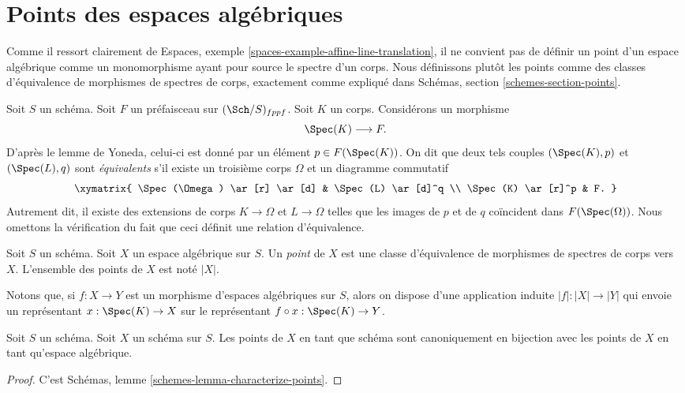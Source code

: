 \section{Points des espaces algébriques}
\label{section-points}

\noindent
Comme il ressort clairement de
Espaces, exemple \ref{spaces-example-affine-line-translation},
il ne convient pas de définir un point d'un espace algébrique comme un monomorphisme
ayant pour source le spectre d'un corps.
Nous définissons plutôt les points comme des classes d'équivalence de morphismes de spectres
de corps, exactement comme expliqué dans
Schémas, section \ref{schemes-section-points}.

\medskip\noindent
Soit $S$ un schéma.
Soit $F$ un préfaisceau sur $(\Sch/S)_{fppf}$.
Soit $K$ un corps. Considérons un morphisme
$$
\Spec(K) \longrightarrow F.
$$
D'après le lemme de Yoneda, celui-ci est donné par un
élément $p \in F(\Spec(K))$. On dit que deux tels
couples $(\Spec(K), p)$ et $(\Spec(L), q)$
sont {\it équivalents} s'il existe
un troisième corps $\Omega$ et un diagramme commutatif
$$
\xymatrix{
\Spec(\Omega) \ar[r] \ar[d] &
\Spec(L) \ar[d]^q \\
\Spec(K) \ar[r]^p &
F.
}
$$
Autrement dit, il existe des extensions de corps
$K \to \Omega$ et $L \to \Omega$ telles que
les images de $p$ et de $q$ coïncident dans
$F(\Spec(\Omega))$. Nous omettons la vérification du fait que ceci
définit une relation d'équivalence.

\begin{definition}
\label{definition-points}
Soit $S$ un schéma. Soit $X$ un espace algébrique sur $S$.
Un {\it point} de $X$ est une classe d'équivalence de morphismes
de spectres de corps vers $X$.
L'ensemble des points de $X$ est noté $|X|$.
\end{definition}

\noindent
Notons que, si $f : X \to Y$ est un morphisme d'espaces algébriques
sur $S$, alors on dispose d'une application induite $|f| : |X| \to |Y|$ qui
envoie un représentant $x : \Spec(K) \to X$ sur le représentant
$f \circ x : \Spec(K) \to Y$.

\begin{lemma}
\label{lemma-scheme-points}
Soit $S$ un schéma. Soit $X$ un schéma sur $S$.
Les points de $X$ en tant que schéma sont canoniquement en bijection
avec les points de $X$ en tant qu'espace algébrique.
\end{lemma}

\begin{proof}
C'est Schémas, lemme \ref{schemes-lemma-characterize-points}.
\end{proof}

